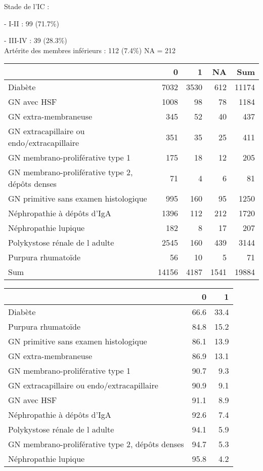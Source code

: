 \documentclass[11pt,a4paper]{article}\usepackage[]{graphicx}\usepackage[]{color}
\begin{document}
Stade de l’IC :

- I-II : 99 (71.7\%)

- III-IV : 39 (28.3\%)
~\\

Artérite des membres inférieurs : 112 (7.4\%) NA = 212

\begin{table}[H]
\centering
\begin{tabular}{lrrrr}
  \hline
 & 0 & 1 & NA & Sum \\ 
  \hline
Diabète & 7032 & 3530 & 612 & 11174 \\ 
  GN avec HSF & 1008 & 98 & 78 & 1184 \\ 
  GN extra-membraneuse & 345 & 52 & 40 & 437 \\ 
  GN extracapillaire ou endo/extracapillaire & 351 & 35 & 25 & 411 \\ 
  GN membrano-proliférative type 1 & 175 & 18 & 12 & 205 \\ 
  GN membrano-proliférative type 2, dépôts denses & 71 & 4 & 6 & 81 \\ 
  GN primitive sans examen histologique & 995 & 160 & 95 & 1250 \\ 
  Néphropathie à dépôts d'IgA & 1396 & 112 & 212 & 1720 \\ 
  Néphropathie lupique & 182 & 8 & 17 & 207 \\ 
  Polykystose rénale de l adulte & 2545 & 160 & 439 & 3144 \\ 
  Purpura rhumatoïde & 56 & 10 & 5 & 71 \\ 
  Sum & 14156 & 4187 & 1541 & 19884 \\ 
   \hline
\end{tabular}
\end{table}
\begin{table}[H]
\centering
\begin{tabular}{lrr}
  \hline
 & 0 & 1 \\ 
  \hline
Diabète & 66.6 & 33.4 \\ 
  Purpura rhumatoïde & 84.8 & 15.2 \\ 
  GN primitive sans examen histologique & 86.1 & 13.9 \\ 
  GN extra-membraneuse & 86.9 & 13.1 \\ 
  GN membrano-proliférative type 1 & 90.7 & 9.3 \\ 
  GN extracapillaire ou endo/extracapillaire & 90.9 & 9.1 \\ 
  GN avec HSF & 91.1 & 8.9 \\ 
  Néphropathie à dépôts d'IgA & 92.6 & 7.4 \\ 
  Polykystose rénale de l adulte & 94.1 & 5.9 \\ 
  GN membrano-proliférative type 2, dépôts denses & 94.7 & 5.3 \\ 
  Néphropathie lupique & 95.8 & 4.2 \\ 
   \hline
\end{tabular}
\end{table}
\end{document}

